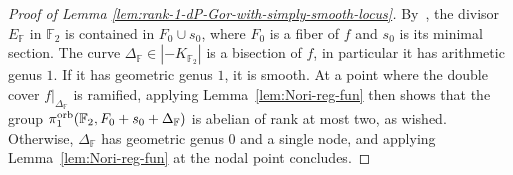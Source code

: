\documentclass{amsart}
\theoremstyle{definition}
\theoremstyle{remark}
\numberwithin{equation}{section}
\begin{document}
\begin{proof}[Proof of Lemma \ref{lem:rank-1-dP-Gor-with-simply-smooth-locus}]
By~\cite[Appendix, Figure 1-6]{Ye02},  the divisor $E_{\mathbb{F}}$ in $\mathbb{F}_2$ is contained in $F_0\cup s_0$, where $F_0$ is a fiber of $f$ and $s_0$ is its minimal section. The curve $\Delta_{\mathbb{F}}\in |-K_{\mathbb{F}_2}|$ is a bisection of $f$, in particular it has arithmetic genus $1$. If it has geometric genus $1$, it is smooth. At a point where the double cover $f|_{\Delta_{\mathbb{F}}}$ is ramified, applying Lemma~\ref{lem:Nori-reg-fun} then shows that the group $\pi_1^{\rm orb}(\mathbb{F}_2,F_0+s_0+\Delta_{\mathbb{F}})$ is abelian of rank at most two, as wished. Otherwise, $\Delta_{\mathbb{F}}$ has geometric genus $0$ and a single node, and applying Lemma~\ref{lem:Nori-reg-fun} at the nodal point concludes.
\end{proof}

\end{document}
